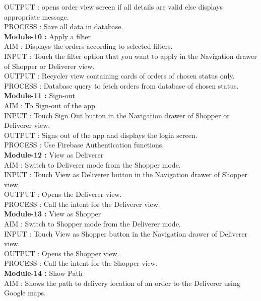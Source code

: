 \documentclass{report}
\begin{document}
					OUTPUT : opens order view screen if all details are valid else displays appropriate message.\\
                    PROCESS : Save all data in database.\\
\newline
\textbf{Module-10 :} Apply a filter\\
					AIM : Displays the orders according to selected filters.\\
					INPUT : Touch the filter option that you want to apply in the Navigation drawer of Shopper or Deliverer view.\\
					OUTPUT : Recycler view containing cards of orders of chosen status only.\\
					PROCESS : Database query to fetch orders from database of chosen status.\\
\newline
\textbf{Module-11 :} Sign-out\\
					AIM : To Sign-out of the app.
					\\INPUT : Touch Sign Out button in the Navigation drawer of Shopper or Deliverer view.\\
					OUTPUT : Signs out of the app and displays the login screen.\\
					PROCESS : Use Firebase Authentication functions.\\
\newline
\textbf{Module-12 :} View as Deliverer\\
					AIM : Switch to Deliverer mode from the Shopper mode.\\
					INPUT : Touch View as Deliverer button in the Navigation drawer of Shopper view.\\
					OUTPUT : Opens the Deliverer view.\\
					PROCESS : Call the intent for the Deliverer view.\\
\newline
\textbf{Module-13 :} View as Shopper\\
					AIM : Switch to Shopper mode from the Deliverer mode.\\
					INPUT : Touch View as Shopper button in the Navigation drawer of Deliverer view.\\
					OUTPUT : Opens the Shopper view.\\
					PROCESS : Call the intent for the Shopper view.\\
\newline
\textbf{Module-14 :} Show Path\\
					AIM : Shows the path to delivery location of an order to the Deliverer using Google maps.\\
\end{document}
